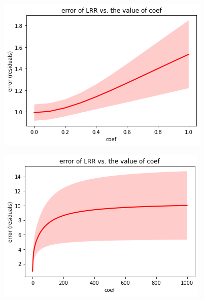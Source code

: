 \documentclass[french,12pt]{article}
\begin{document}
\begin{figure}[ht]
\centering
\begin{minipage}{.45\textwidth}
	\centering
	\includegraphics[width=\textwidth]{LRR_error_vs_coef1.png}
	\label{fig:LRR_error_vs_coef1}
\end{minipage}
\hfill
\begin{minipage}{.45\textwidth}
	\centering
	\includegraphics[width=\textwidth]{LRR_error_vs_coef1000.png}
	\label{fig:LRR_error_vs_coef1000}
\end{minipage}
\end{figure}
\end{document}
